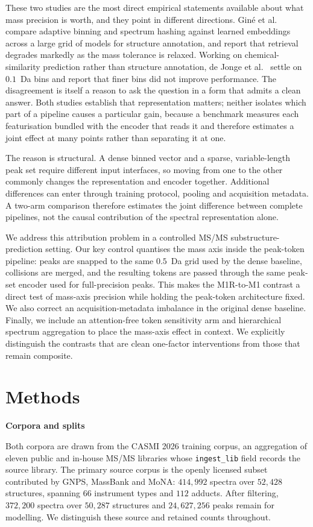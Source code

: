 \documentclass[11pt]{article}
\newcommand{\hd}[1]{\medskip\par\noindent\textbf{#1}\par\nobreak\vspace{2pt}\noindent\ignorespaces}
\begin{document}
These two studies are the most direct empirical statements available about what mass precision is worth, and they point in different directions. Gin\'e et al.\ \cite{gine2026benchmarking} compare adaptive binning and spectrum hashing against learned embeddings across a large grid of models for structure annotation, and report that retrieval degrades markedly as the mass tolerance is relaxed. Working on chemical-similarity prediction rather than structure annotation, de Jonge et al.\ \cite{dejonge2026cross} settle on $0.1$~Da bins and report that finer bins did not improve performance. The disagreement is itself a reason to ask the question in a form that admits a clean answer. Both studies establish that representation matters; neither isolates which part of a pipeline causes a particular gain, because a benchmark measures each featurisation bundled with the encoder that reads it and therefore estimates a joint effect at many points rather than separating it at one.

The reason is structural. A dense binned vector and a sparse, variable-length peak set require different input interfaces, so moving from one to the other commonly changes the representation and encoder together. Additional differences can enter through training protocol, pooling and acquisition metadata. A two-arm comparison therefore estimates the joint difference between complete pipelines, not the causal contribution of the spectral representation alone.

We address this attribution problem in a controlled MS/MS substructure-prediction setting. Our key control quantises the mass axis inside the peak-token pipeline: peaks are snapped to the same $0.5$~Da grid used by the dense baseline, collisions are merged, and the resulting tokens are passed through the same peak-set encoder used for full-precision peaks. This makes the M1R-to-M1 contrast a direct test of mass-axis precision while holding the peak-token architecture fixed. We also correct an acquisition-metadata imbalance in the original dense baseline. Finally, we include an attention-free token sensitivity arm and hierarchical spectrum aggregation to place the mass-axis effect in context. We explicitly distinguish the contrasts that are clean one-factor interventions from those that remain composite.

\section*{Methods}
\hd{Corpora and splits}
Both corpora are drawn from the CASMI 2026 training corpus, an aggregation of eleven public and in-house MS/MS libraries whose \texttt{ingest\_lib} field records the source library. The primary source corpus is the openly licensed subset contributed by GNPS, MassBank and MoNA: $414{,}992$ spectra over $52{,}428$ structures, spanning $66$ instrument types and $112$ adducts. After filtering, $372{,}200$ spectra over $50{,}287$ structures and $24{,}627{,}256$ peaks remain for modelling. We distinguish these source and retained counts throughout.
\end{document}
